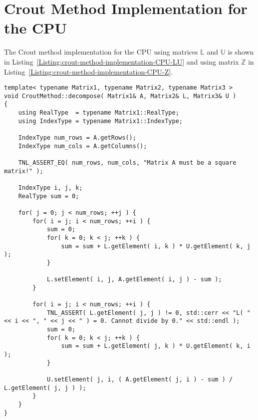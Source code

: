 \chapter{Crout Method Implementation for the CPU}\label{Attachment:crout-method-implementation-CPU}
The Crout method implementation for the CPU using matrices $ \mathbb{L} $ and $ \mathbb{U} $ is shown in Listing~\ref{Listing:crout-method-implementation-CPU-LU} and using matrix $ \mathbb{Z} $ in Listing~\ref{Listing:crout-method-implementation-CPU-Z}.
\begin{lstlisting}[language={},caption={Implementation of the Crout method on the CPU using matrices $ \mathbb{L} $ and $ \mathbb{U} $. All matrix and variable types are obtained from template arguments of the method. Taken from the Decomposition project repository on GitLab\protect\footref{Footnote:decomposition-project-gitlab-url}.},label={Listing:crout-method-implementation-CPU-LU}]
template< typename Matrix1, typename Matrix2, typename Matrix3 >
void CroutMethod::decompose( Matrix1& A, Matrix2& L, Matrix3& U )
{
	using RealType  = typename Matrix1::RealType;
	using IndexType = typename Matrix1::IndexType;
	
	IndexType num_rows = A.getRows();
	IndexType num_cols = A.getColumns();
	
	TNL_ASSERT_EQ( num_rows, num_cols, "Matrix A must be a square matrix!" );
	
	IndexType i, j, k;
	RealType sum = 0;
	
	for( j = 0; j < num_rows; ++j )	{
		for( i = j; i < num_rows; ++i ) {
			sum = 0;
			for( k = 0; k < j; ++k ) {
				sum = sum + L.getElement( i, k ) * U.getElement( k, j );
			}
		
			L.setElement( i, j, A.getElement( i, j ) - sum );
		}
		
		for( i = j; i < num_rows; ++i ) {
			TNL_ASSERT( L.getElement( j, j ) != 0, std::cerr << "L( " << i << ", " << j << " ) = 0. Cannot divide by 0." << std::endl );
			sum = 0;
			for( k = 0; k < j; ++k ) {
				sum = sum + L.getElement( j, k ) * U.getElement( k, i );
			}
		
			U.setElement( j, i, ( A.getElement( j, i ) - sum ) / L.getElement( j, j ) );
		}
	}	
}
\end{lstlisting}


